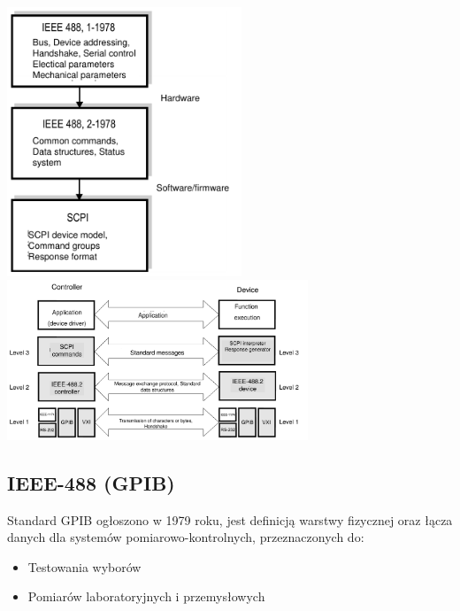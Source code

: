 \includegraphics[width=7cm]{./wyklady/IEEE488_SCPI_17_1.pdf}
\includegraphics[width=9cm]{./wyklady/IEEE488_SCPI_18_1.pdf}

\subsection{IEEE-488 (GPIB)}
Standard GPIB ogłoszono w 1979 roku, jest definicją warstwy fizycznej oraz łącza danych dla systemów pomiarowo-kontrolnych, przeznaczonych do:
\begin{itemize}
	\item Testowania wyborów
	\item Pomiarów laboratoryjnych i przemysłowych
\end{itemize}

